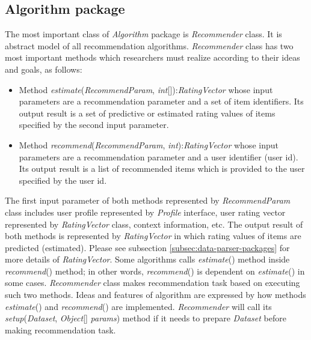 \documentclass[a4paper]{llncs}
\begin{document}
\subsection{Algorithm package}
\label{subsec:algorithm-package}
The most important class of \textit{Algorithm} package is \textit{Recommender} class. It is abstract model of all recommendation algorithms. \textit{Recommender} class has two most important methods which researchers must realize according to their ideas and goals, as follows:
\begin{itemize}
\item Method \textit{estimate}(\textit{RecommendParam}, \textit{int}[]):\textit{RatingVector} whose input parameters are a recommendation parameter and a set of item identifiers. Its output result is a set of predictive or estimated rating values of items specified by the second input parameter.
\item Method \textit{recommend}(\textit{RecommendParam}, \textit{int}):\textit{RatingVector} whose input parameters are a recommendation parameter and a user identifier (user id). Its output result is a list of recommended items which is provided to the user specified by the user id.
\end{itemize}
The first input parameter of both methods represented by \textit{RecommendParam} class includes user profile represented by \textit{Profile} interface, user rating vector represented by \textit{RatingVector} class, context information, etc. The output result of both methods is represented by \textit{RatingVector} in which rating values of items are predicted (estimated). Please see subsection \ref{subsec:data-parser-packages} for more details of \textit{RatingVector}. Some algorithms calls \textit{estimate}() method inside \textit{recommend}() method; in other words, \textit{recommend}() is dependent on \textit{estimate}() in some cases. \textit{Recommender} class makes recommendation task based on executing such two methods. Ideas and features of algorithm are expressed by how methods \textit{estimate}() and \textit{recommend}() are implemented. \textit{Recommender} will call its \textit{setup}(\textit{Dataset}, \textit{Object}[] \textit{params}) method if it needs to prepare \textit{Dataset} before making recommendation task.
\end{document}
